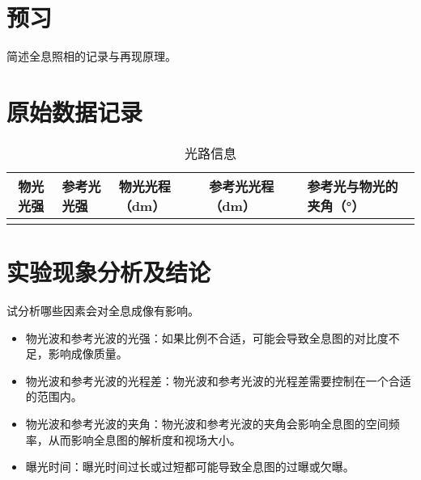 \documentclass[signature=preparation]{physicsreport}
\begin{document}
\maketitle

\section{预习}
简述全息照相的记录与再现原理。

\newpage

\section{原始数据记录}


\begin{table*}[ht]
    \renewcommand{\arraystretch}{1.4}
    \small\selectfont
    \centering
    \caption{光路信息}
    \begin{tabularx}{\textwidth}{|c|Y|Y|Y|Y|}\hline
        物光光强 & 参考光光强  & 物光光程（dm） & 参考光光程（dm）  & 参考光与物光的夹角（°） \\\hline
                &            &               &                  &                       \\\hline
    \end{tabularx}
\end{table*}

\makeatletter
{}
\makeatother

\newpage

\section{实验现象分析及结论}
试分析哪些因素会对全息成像有影响。
\begin{itemize}
    \item 物光波和参考光波的光强：如果比例不合适，可能会导致全息图的对比度不足，影响成像质量。
    \item 物光波和参考光波的光程差：物光波和参考光波的光程差需要控制在一个合适的范围内。
    \item 物光波和参考光波的夹角：物光波和参考光波的夹角会影响全息图的空间频率，从而影响全息图的解析度和视场大小。
    \item 曝光时间：曝光时间过长或过短都可能导致全息图的过曝或欠曝。
\end{itemize}
\vspace*{8cm}
\end{document}
